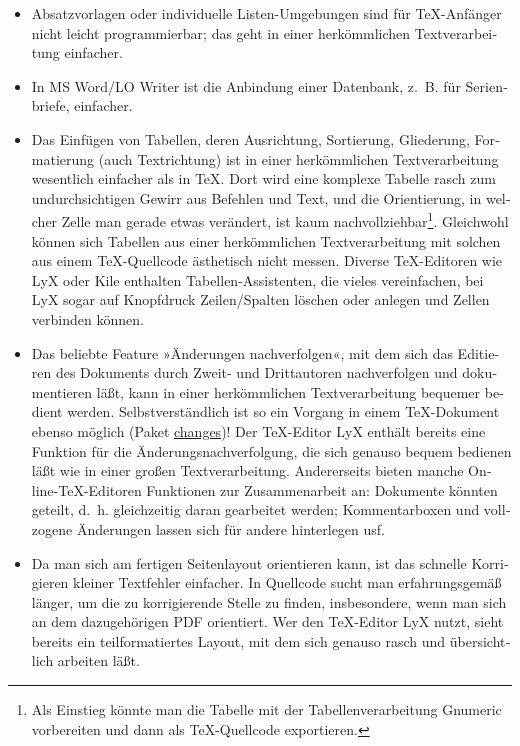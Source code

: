 \documentclass[11pt,a4paper,ngerman,french,DIV=8]{scrartcl}
\begin{document}
\begin{otherlanguage}{ngerman}
\begin{itemize}
  \item Absatzvorlagen oder individuelle Listen-Umgebungen sind für \TeX{}-Anfänger nicht leicht programmierbar; das geht in einer herkömmlichen Textverarbeitung einfacher.
  \item In MS Word/LO Writer ist die Anbindung einer Datenbank, z.~B. für Serienbriefe, einfacher.
  \item Das Einfügen von Tabellen, deren Ausrichtung, Sortierung, Gliederung, Formatierung (auch Textrichtung) ist in einer herkömmlichen Textverarbeitung wesentlich einfacher als in \TeX{}. Dort wird eine komplexe Tabelle rasch zum undurchsichtigen Gewirr aus Befehlen und Text, und die Orientierung, in welcher Zelle man gerade etwas verändert, ist kaum nachvollziehbar\footnote{Als Einstieg könnte man die Tabelle mit der Tabellenverarbeitung Gnumeric vorbereiten und dann als \TeX{}-Quellcode exportieren.}. Gleichwohl können sich Tabellen aus einer herkömmlichen Textverarbeitung mit solchen aus einem \TeX{}-Quellcode ästhetisch nicht messen. Diverse \TeX{}-Editoren wie LyX oder Kile enthalten Tabellen-Assistenten, die vieles vereinfachen, bei LyX sogar auf Knopfdruck Zeilen/Spalten löschen oder anlegen und Zellen verbinden können.
  \item Das beliebte Feature »Änderungen nachverfolgen«, mit dem sich das Editieren des Dokuments durch Zweit- und Drittautoren nachverfolgen und dokumentieren läßt, kann in einer herkömmlichen Textverarbeitung bequemer bedient werden. Selbstverständlich ist so ein Vorgang in einem \TeX{}-Dokument ebenso möglich (Paket \href{https://www.teuderun.de/latex/n\%C3\%BCtzliche-kniffe/\%C3\%A4nderungsverfolgung/}{changes})! Der \TeX{}-Editor LyX enthält bereits eine Funktion für die Änderungsnachverfolgung, die sich genauso bequem bedienen läßt wie in einer großen Textverarbeitung. Andererseits bieten manche Online-\TeX{}-Editoren Funktionen zur Zusammenarbeit an: Dokumente könnten geteilt, d.~h. gleichzeitig daran gearbeitet werden; Kommentarboxen und vollzogene Änderungen lassen sich für andere hinterlegen usf.
  \item Da man sich am fertigen Seitenlayout orientieren kann, ist das schnelle Korrigieren kleiner Textfehler einfacher. In Quellcode sucht man erfahrungsgemäß länger, um die zu korrigierende Stelle zu finden, insbesondere, wenn man sich an dem dazugehörigen PDF orientiert. Wer den \TeX{}-Editor LyX nutzt, sieht bereits ein teilformatiertes Layout, mit dem sich genauso rasch und übersichtlich arbeiten läßt.
\end{itemize}


\end{otherlanguage}
\end{document}
